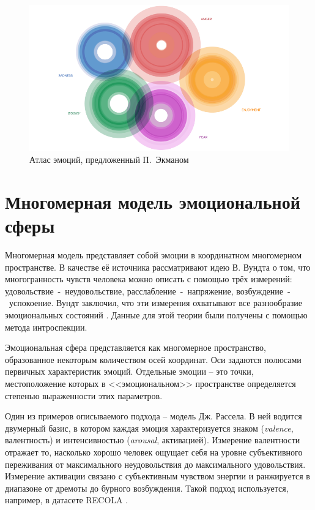 \begin{figure}[H]
	\centering
	\includegraphics[width=\linewidth]{assets/emo-atlas.png}
	\caption{Атлас эмоций, предложенный П.~Экманом}
	\label{fig:emo-atlas}
\end{figure}

\section{Многомерная модель эмоциональной сферы}
Многомерная модель представляет собой эмоции в координатном многомерном пространстве. В качестве её источника рассматривают идею В. Вундта о том, что многогранность чувств
человека можно описать с помощью трёх измерений: удовольствие~-~неудовольствие, расслабление~-~напряжение, возбуждение~-~успокоение. Вундт заключил, что эти измерения охватывают все разнообразие эмоциональных состояний \cite{Вундт1984}. Данные для этой теории были получены с помощью метода интроспекции.

Эмоциональная сфера представляется как многомерное пространство, образованное некоторым
количеством осей координат. Оси задаются полюсами первичных характеристик эмоций. Отдельные эмоции -- это точки, местоположение которых в <<эмоциональном>> пространстве определяется степенью выраженности этих параметров.

Один из примеров описываемого подхода -- модель Дж. Рассела. В ней водится двумерный базис, в котором каждая эмоция характеризуется знаком (\textit{valence}, валентность) и интенсивностью (\textit{arousal}, активацией). Измерение валентности отражает то,
насколько хорошо человек ощущает себя на уровне субъективного переживания от максимального неудовольствия до максимального удовольствия. Измерение активации связано с
субъективным чувством энергии и ранжируется в диапазоне от дремоты до бурного возбуждения. Такой подход используется, например, в датасете RECOLA \cite{RECOLA}.

